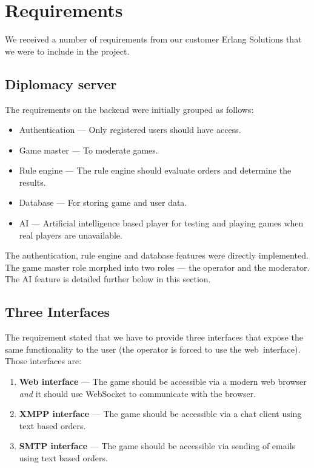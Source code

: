 \documentclass[11pt,a4paper]{report}
\begin{document}
\section{Requirements}
We received a number of requirements from our customer Erlang Solutions that we
were to include in the project.

\subsection{Diplomacy server}
The requirements on the backend were initially grouped as follows:

\begin{itemize}
\item Authentication --- Only registered users should have access.
\item Game master --- To moderate games.
\item Rule engine --- The rule engine should evaluate orders and determine
      the results.
\item Database --- For storing game and user data.
\item AI --- Artificial intelligence based player for testing and playing games
      when real players are unavailable.
\end{itemize}

The authentication, rule engine and database features were directly
implemented. The game master role morphed into two roles --- the operator and
the moderator. The AI feature is detailed further below in this section.

\subsection{Three Interfaces}
The requirement stated that we have to provide three interfaces that expose
the same functionality to the user (the operator is forced to use the
web~interface). Those interfaces are:\\
\begin{enumerate}
\item {\bf Web interface} ---
  The game should be accessible via a modern web browser {\em and\/} it should
  use WebSocket to communicate with the browser.
\item {\bf XMPP interface} ---
  The game should be accessible via a chat client using text based orders.
\item {\bf SMTP interface} ---
  The game should be accessible via sending of emails using text based orders.
\end{enumerate}
\end{document}

